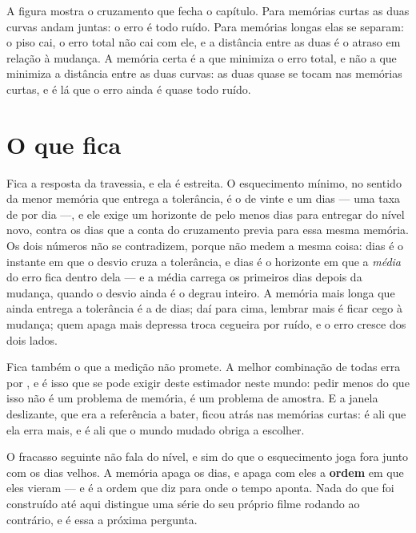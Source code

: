 A figura mostra o cruzamento que fecha o capítulo. Para memórias curtas as duas curvas andam juntas:
o erro é todo ruído. Para memórias longas elas se separam: o piso cai, o erro total não cai com ele,
e a distância entre as duas é o atraso em relação à mudança. A memória certa é a que minimiza o erro
total, e não a que minimiza a distância entre as duas curvas: as duas quase se tocam nas memórias
curtas, e é lá que o erro ainda é quase todo ruído.

\section{O que fica}

Fica a resposta da travessia, e ela é estreita. O esquecimento mínimo, no sentido da menor memória que entrega a tolerância, é o de vinte e um
dias --- uma taxa de \numEsquecimentoMelhorTaxa{} por
dia ---, e ele exige um horizonte de pelo menos \numEsquecimentoHorizonteCurto{} dias para entregar
\numEsquecimentoTolerancia{} do nível novo, contra os \numEsquecimentoMelhorDias{} dias que a conta
do cruzamento previa para essa mesma memória. Os dois números não se contradizem, porque não medem a
mesma coisa: \numEsquecimentoMelhorDias{} dias é o instante em que o desvio cruza a tolerância, e
\numEsquecimentoHorizonteCurto{} dias é o horizonte em que a \emph{média} do erro fica dentro dela ---
e a média carrega os primeiros dias depois da mudança, quando o desvio ainda é o degrau inteiro. A memória mais longa que ainda entrega a tolerância é a de \numEsquecimentoMemoriaLonga{} dias;
daí para cima, lembrar mais é ficar cego à mudança; quem apaga
mais depressa troca cegueira por ruído, e o erro cresce dos dois lados.

Fica também o que a medição não promete. A melhor combinação de todas erra por
\numEsquecimentoMelhor{}, e é isso que se pode exigir deste estimador neste mundo: pedir menos do que
isso não é um problema de memória, é um problema de amostra. E a janela deslizante, que era a
referência a bater, ficou atrás nas memórias curtas: é ali que ela erra mais, e é ali que o mundo
mudado obriga a escolher.

O fracasso seguinte não fala do nível, e sim do que o esquecimento joga fora junto com os dias velhos.
A memória apaga os dias, e apaga com eles a \textbf{ordem} em que eles vieram --- e é a ordem que diz para
onde o tempo aponta. Nada do que foi construído até aqui distingue uma série do seu próprio filme
rodando ao contrário, e é essa a próxima pergunta.

